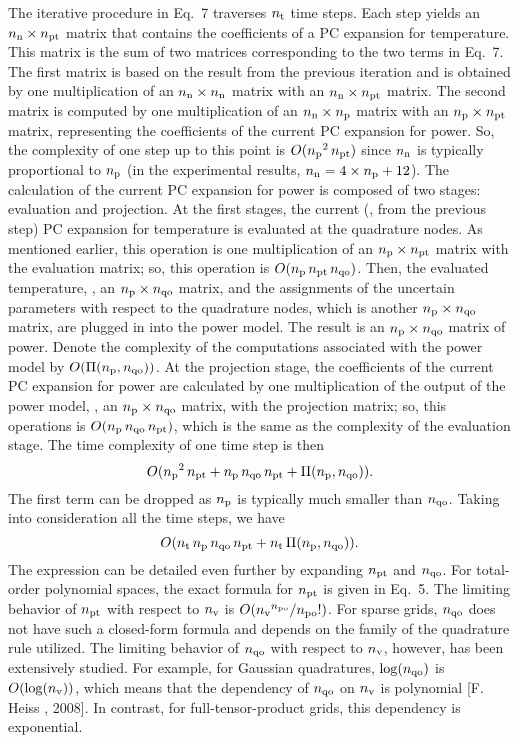 \begin{authors}
The iterative procedure in Eq.~7 traverses ${n_\text{t}}$ time steps.
Each step yields an ${n_\text{n}} \times {n_\text{pt}}$ matrix that contains the coefficients of a PC expansion for temperature.
This matrix is the sum of two matrices corresponding to the two terms in Eq.~7.
The first matrix is based on the result from the previous iteration and is obtained by one multiplication of an ${n_\text{n}} \times {n_\text{n}}$ matrix with an ${n_\text{n}} \times {n_\text{pt}}$ matrix.
The second matrix is computed by one multiplication of an ${n_\text{n}} \times {n_\text{p}}$ matrix with an ${n_\text{p}} \times {n_\text{pt}}$ matrix, representing the coefficients of the current PC expansion for power.
So, the complexity of one step up to this point is $O({n_\text{p}}^2 \, {n_\text{pt}})$ since ${n_\text{n}}$ is typically proportional to ${n_\text{p}}$ (in the experimental results, ${n_\text{n}} = 4 \times {n_\text{p}} + 12$).
The calculation of the current PC expansion for power is composed of two stages: evaluation and projection.
At the first stages, the current (\ie, from the previous step) PC expansion for temperature is evaluated at the quadrature nodes.
As mentioned earlier, this operation is one multiplication of an ${n_\text{p}} \times {n_\text{pt}}$ matrix with the evaluation matrix; so, this operation is $O({n_\text{p}} \, {n_\text{pt}} \, {n_\text{qo}})$.
Then, the evaluated temperature, \ie, an ${n_\text{p}} \times {n_\text{qo}}$ matrix, and the assignments of the uncertain parameters with respect to the quadrature nodes, which is another ${n_\text{p}} \times {n_\text{qo}}$ matrix, are plugged in into the power model.
The result is an ${n_\text{p}} \times {n_\text{qo}}$ matrix of power.
Denote the complexity of the computations associated with the power model by $O(\Pi({n_\text{p}}, {n_\text{qo}}))$.
At the projection stage, the coefficients of the current PC expansion for power are calculated by one multiplication of the output of the power model, \ie, an ${n_\text{p}} \times {n_\text{qo}}$ matrix, with the projection matrix; so, this operations is $O({n_\text{p}} \, {n_\text{qo}} \, {n_\text{pt}})$, which is the same as the complexity of the evaluation stage.
The time complexity of one time step is then
\[
  O({n_\text{p}}^2 \, {n_\text{pt}} + {n_\text{p}} \, {n_\text{qo}} \, {n_\text{pt}} + \Pi({n_\text{p}}, {n_\text{qo}})).
\]
The first term can be dropped as ${n_\text{p}}$ is typically much smaller than ${n_\text{qo}}$.
Taking into consideration all the time steps, we have
\[
  O({n_\text{t}} \, {n_\text{p}} \, {n_\text{qo}} \, {n_\text{pt}} + {n_\text{t}} \, \Pi({n_\text{p}}, {n_\text{qo}})).
\]
The expression can be detailed even further by expanding ${n_\text{pt}}$ and ${n_\text{qo}}$.
For total-order polynomial spaces, the exact formula for ${n_\text{pt}}$ is given in Eq.~5.
The limiting behavior of ${n_\text{pt}}$ with respect to ${n_\text{v}}$ is $O({n_\text{v}}^{n_\text{po}} / {n_\text{po}}!)$.
For sparse grids, ${n_\text{qo}}$ does not have such a closed-form formula and depends on the family of the quadrature rule utilized.
The limiting behavior of ${n_\text{qo}}$ with respect to ${n_\text{v}}$, however, has been extensively studied.
For example, for Gaussian quadratures, $\log({n_\text{qo}})$ is $O(\log({n_\text{v}}))$, which means that the dependency of ${n_\text{qo}}$ on ${n_\text{v}}$ is polynomial [F. Heiss \etal, 2008].
In contrast, for full-tensor-product grids, this dependency is exponential.

\end{authors}

